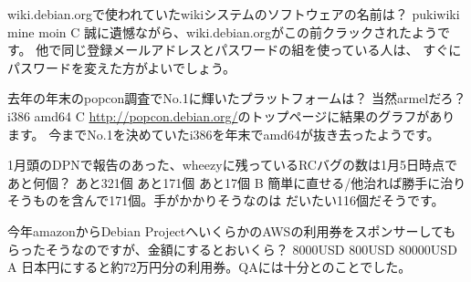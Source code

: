 %

\santaku
{wiki.debian.orgで使われていたwikiシステムのソフトウェアの名前は？}
{pukiwiki}
{mine}
{moin}
{C}
{誠に遺憾ながら、wiki.debian.orgがこの前クラックされたようです。
他で同じ登録メールアドレスとパスワードの組を使っている人は、
すぐにパスワードを変えた方がよいでしょう。}

\santaku
{去年の年末のpopcon調査でNo.1に輝いたプラットフォームは？}
{当然armelだろ？}
{i386}
{amd64}
{C}
{\url{http://popcon.debian.org/}のトップページに結果のグラフがあります。
 今までNo.1を決めていたi386を年末でamd64が抜き去ったようです。}

\santaku
{1月頭のDPNで報告のあった、wheezyに残っているRCバグの数は1月5日時点であと何個？}
{あと321個}
{あと171個}
{あと17個}
{B}
{簡単に直せる/他治れば勝手に治りそうものを含んで171個。手がかかりそうなのは
だいたい116個だそうです。}

\santaku
{今年amazonからDebian ProjectへいくらかのAWSの利用券をスポンサーしてもらったそうなのですが、金額にするとおいくら？}
{8000USD}
{800USD}
{80000USD}
{A}
{日本円にすると約72万円分の利用券。QAには十分とのことでした。}










